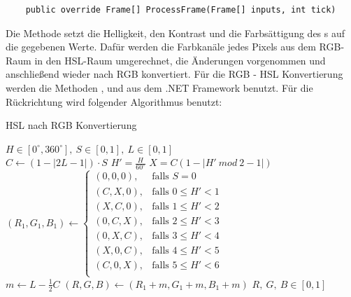 \begin{itemize}
	\begin{verbatim}
	public override Frame[] ProcessFrame(Frame[] inputs, int tick)
	\end{verbatim}
	Die Methode  setzt die Helligkeit, den Kontrast und die Farbsättigung des s auf die gegebenen Werte. Dafür werden die Farbkanäle jedes Pixels aus dem RGB-Raum in den HSL-Raum umgerechnet, die Änderungen vorgenommen und anschließend wieder nach RGB konvertiert. Für die RGB - HSL Konvertierung werden die Methoden ,  und  aus dem .NET Framework benutzt. Für die Rückrichtung wird folgender Algorithmus benutzt:
	\begin{algorithm}[H]
	\caption{HSL nach RGB Konvertierung}
		\begin{algorithmic}[1]
			\REQUIRE $ H \in [0^\circ, 360^\circ], \ S \in [0, 1], \ L \in [0, 1] $ \\
			\vspace{3px}
			\STATE $ C \gets (1 - |2L - 1|) \cdot S $
			\STATE $ H' = \frac{H}{60^\circ} $
			\STATE $ X = C(1 - |H' \ mod \ 2 - 1|) $
			\vspace{3px}
			\STATE $ (R_1, G_1, B_1) \gets
					\begin{cases} 
						(0, 0, 0), & \text{falls } S = 0 \\
						(C, X, 0), & \text{falls } 0 \leq H' < 1 \\
						(X, C, 0), & \text{falls } 1 \leq H' < 2 \\
						(0, C, X), & \text{falls } 2 \leq H' < 3 \\
						(0, X, C), & \text{falls } 3 \leq H' < 4 \\
						(X, 0, C), & \text{falls } 4 \leq H' < 5 \\
						(C, 0, X), & \text{falls } 5 \leq H' < 6 \\
					\end{cases}
				   $
			\vspace{3px} \\
			\vspace{3px}
			\STATE $ m \gets L - \frac{1}{2}C $
			\STATE $ (R, G, B) \gets (R_1 + m, G_1 + m, B_1 + m) $
			\vspace{3px}
			\ENSURE $ R, \ G, \ B \in [0, 1] $ \\
		\end{algorithmic}
	\end{algorithm}
	

\end{itemize}
